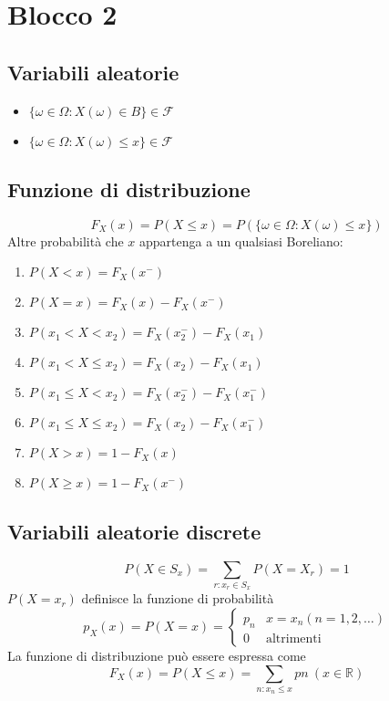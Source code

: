 \section*{Blocco 2}
\subsection*{Variabili aleatorie}
\begin{itemize}
    \item $\{\omega \in \Omega : X(\omega) \in B\} \in \mathscr{F}$
    \item $\{\omega \in \Omega : X(\omega) \le x\} \in \mathscr{F}$
\end{itemize}

\subsection*{Funzione di distribuzione}
$$
F_X(x) = P(X \le x) = P(\{\omega \in \Omega : X(\omega) \le x\})
$$
Altre probabilità che $x$ appartenga a un qualsiasi Boreliano:
\begin{enumerate}
    \item $P(X < x) = F_X(x^-)$
    \item $P(X = x) = F_X(x) - F_X(x^-)$
    \item $P(x_1 < X < x_2) = F_X(x_2^-) - F_X(x_1)$
    \item $P(x_1 < X \le x_2) = F_X(x_2) - F_X(x_1)$
    \item $P(x_1 \le X < x_2) = F_X(x_2^-) - F_X(x_1^-)$
    \item $P(x_1 \le X \le x_2) = F_X(x_2) - F_X(x_1^-)$
    \item $P(X > x) = 1 - F_X(x)$
    \item $P(X \ge x) = 1 - F_X(x^-)$
\end{enumerate}

\subsection*{Variabili aleatorie discrete}
$$
P(X \in S_x) = \sum_{r : x_r \in S_x}P(X = X_r) = 1
$$
$P(X = x_r)$ definisce la funzione di probabilità
$$
p_X(x) = P(X = x) =
\begin{cases}
    p_n & x = x_n (n = 1,2,\dots)\\
    0 & \text{altrimenti}
\end{cases}
$$
La funzione di distribuzione può essere espressa come
$$
F_X(x) = P(X \le x) = \sum_{n: x_n \le x} pn \ (x \in \mathbb{R})
$$

